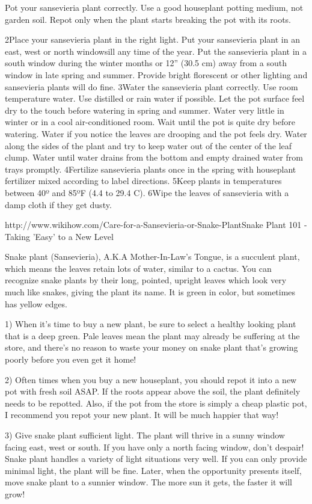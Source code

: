 \documentclass{book}
\begin{document}
Pot your sansevieria plant correctly.
Use a good houseplant potting medium, not garden soil.
Repot only when the plant starts breaking the pot with its roots.

 
2Place your sansevieria plant in the right light.
Put your sansevieria plant in an east, west or north windowsill any time of the year.
Put the sansevieria plant in a south window during the winter months or 12” (30.5 cm) away from a south window in late spring and summer.
Provide bright florescent or other lighting and sansevieria plants will do fine.
3Water the sansevieria plant correctly.
Use room temperature water.
Use distilled or rain water if possible.
Let the pot surface feel dry to the touch before watering in spring and summer.
Water very little in winter or in a cool air-conditioned room. Wait until the pot is quite dry before watering.
Water if you notice the leaves are drooping and the pot feels dry.
Water along the sides of the plant and try to keep water out of the center of the leaf clump.
Water until water drains from the bottom and empty drained water from trays promptly.
4Fertilize sansevieria plants once in the spring with houseplant fertilizer mixed according to label directions.
5Keep plants in temperatures between 40º and 85ºF (4.4 to 29.4 C).
6Wipe the leaves of sansevieria with a damp cloth if they get dusty.

http://www.wikihow.com/Care-for-a-Sansevieria-or-Snake-PlantSnake Plant 101 - Taking 'Easy' to a New Level

Snake plant (Sansevieria), A.K.A Mother-In-Law’s Tongue, is a succulent plant, which means the leaves retain lots of water, similar to a cactus. You can recognize snake plants by their long, pointed, upright leaves which look very much like snakes, giving the plant its name. It is green in color, but sometimes has yellow edges.

1) When it’s time to buy a new plant, be sure to select a healthy looking plant that is a deep green. Pale leaves mean the plant may already be suffering at the store, and there’s no reason to waste your money on snake plant that’s growing poorly before you even get it home!

2) Often times when you buy a new houseplant, you should repot it into a new pot with fresh soil ASAP. If the roots appear above the soil, the plant definitely needs to be repotted. Also, if the pot from the store is simply a cheap plastic pot, I recommend you repot your new plant. It will be much happier that way!

3) Give snake plant sufficient light. The plant will thrive in a sunny window facing east, west or south. If you have only a north facing window, don’t despair! Snake plant handles a variety of light situations very well. If you can only provide minimal light, the plant will be fine. Later, when the opportunity presents itself, move snake plant to a sunnier window. The more sun it gets, the faster it will grow!
\end{document}
